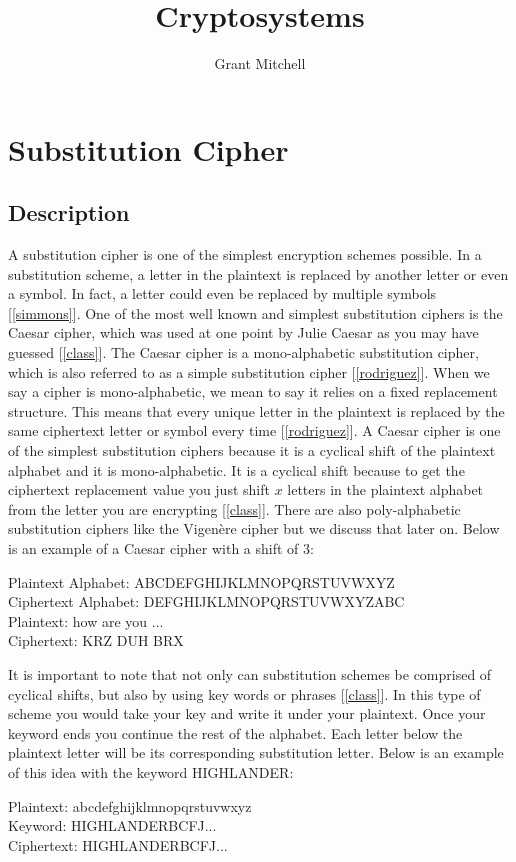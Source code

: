 \documentclass[12pt]{article}
\begin{document}
\author{Grant Mitchell}
\title{Cryptosystems}
\maketitle
\newpage

\section{Substitution Cipher}

\subsection{Description}
A substitution cipher is one of the simplest encryption schemes possible. In a substitution scheme, a letter in the plaintext is replaced by another letter or even a symbol. In fact, a letter could even be replaced by multiple symbols [\ref{simmons}]. One of the most well known and simplest substitution ciphers is the Caesar cipher, which was used at one point by Julie Caesar as you may have guessed [\ref{class}]. The Caesar cipher is a mono-alphabetic substitution cipher, which is also referred to as a simple substitution cipher [\ref{rodriguez}]. When we say a cipher is mono-alphabetic, we mean to say it relies on a fixed replacement structure. This means that every unique letter in the plaintext is replaced by the same ciphertext letter or symbol every time [\ref{rodriguez}]. A Caesar cipher is one of the simplest substitution ciphers because it is a cyclical shift of the plaintext alphabet and it is mono-alphabetic. It is a cyclical shift because to get the ciphertext replacement value you just shift $x$ letters in the plaintext alphabet from the letter you are encrypting [\ref{class}]. There are also poly-alphabetic substitution ciphers like the Vigenère cipher but we discuss that later on. Below is an example of a Caesar cipher with a shift of 3:
\begin{center}
    Plaintext Alphabet: ABCDEFGHIJKLMNOPQRSTUVWXYZ\\
    Ciphertext Alphabet: DEFGHIJKLMNOPQRSTUVWXYZABC\\
    \;\;Plaintext: \;\;\;\;\;how are you ...\\
    Ciphertext: KRZ DUH BRX\\
\end{center}
It is important to note that not only can substitution schemes be comprised of cyclical shifts, but also by using key words or phrases [\ref{class}]. In this type of scheme you would take your key and write it under your plaintext. Once your keyword ends you continue the rest of the alphabet. Each letter below the plaintext letter will be its corresponding substitution letter. Below is an example of this idea with the keyword HIGHLANDER:
\begin{center}
    \hspace{1cm} Plaintext: abcdefghijklmnopqrstuvwxyz\\
    Keyword: \;HIGHLANDERBCFJ...\\
    Ciphertext: HIGHLANDERBCFJ...\\
\end{center}
\end{document}
